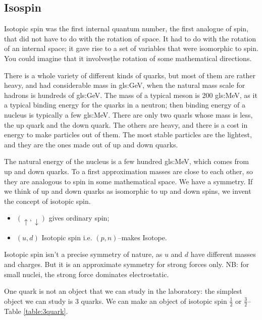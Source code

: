 \documentclass[]{article}
\begin{document}
\subsection{Isospin}

Isotopic spin was the first internal quantum number, the first analogue of spin, that did not have to do with the rotation of space. It had to do with the rotation of an internal space; it gave rise to a set of variables that were isomorphic to spin. You could imagine that it involves\d the rotation of some mathematical directions.

There is a whole variety of different kinds of quarks, but most of them are rather heavy, and had considerable mass in \gls{gls:GeV}, when the natural mass scale for hadrons is hundreds of \gls{gls:GeV}. The mass of a typical meson is 200 \gls{gls:MeV}, as it a typical binding energy for the quarks in a neutron; then binding energy of a nucleus is typically a few \gls{gls:MeV}. There are only two quarls whose mass is less, the up quark and the down quark. The others are heavy, and there is a cost in energy to make particles out of them. The most stable particles are the lightest, and they are the ones made out of up and down quarks.

The natural energy of the nucleus is a few hundred \gls{gls:MeV}, which comes from up and down quarks. To a first approximation masses are close to each other, so they are analogous to spin in some mathematical space. We have a symmetry. If we think of up and down quarks as isomorphic to up and down spins, we invent the concept of isotopic spin.

\begin{itemize}
	\item $(\uparrow,\downarrow)$ gives ordinary spin;
	\item $(u,d)$ Isotopic spin i.e.  $(p,n)$--makes Isotope.
\end{itemize}

Isotopic spin isn't a precise symmetry of nature, as $u$ and $d$ have different masses and charges. But it is an approximate symmetry for strong forces only. NB: for small nuclei, the strong force dominates electrostatic.

One quark is not an object that we can study in the laboratory: the simplest object we can study is 3 quarks. We can make an object of isotopic spin $\frac{1}{2}$ or $\frac{3}{2}$--Table \ref{table:3quark}.
\end{document}
